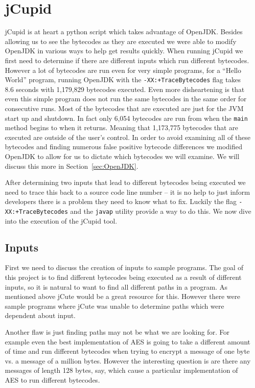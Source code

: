 \documentclass[letterpaper,twocolumn,10pt]{article}
\begin{document}
\section{jCupid}
jCupid is at heart a python script which takes advantage of OpenJDK. Besides allowing us to see the bytecodes as they are executed we were able to modify OpenJDK in various ways to help get results quickly. When running jCupid we first need to determine if there are different inputs which run different bytecodes. However a lot of bytecodes are run even for very simple programs, for a ``Hello World'' program, running OpenJDK with the \texttt{-XX:+TraceBytecodes} flag takes 8.6 seconds with 1,179,829 bytecodes executed. Even more disheartening is that even this simple program does not run the same bytecodes in the same order for consecutive runs. Most of the bytecodes that are executed are just for the JVM start up and shutdown. In fact only 6,054 bytecodes are run from when the \texttt{main} method begins to when it returns. Meaning that 1,173,775 bytecodes that are executed are outside of the user's control. In order to avoid examining all of these bytecodes and finding numerous false positive bytecode differences we modified OpenJDK to allow for us to dictate which bytecodes we will examine. We will discuss this more in Section~\ref{sec:OpenJDK}.

After determining two inputs that lead to different bytecodes being executed we need to trace this back to a source code line number -- it is no help to just inform developers there is a problem they need to know what to fix. Luckily the flag \texttt{-XX:+TraceBytecodes} and the \texttt{javap} utility provide a way to do this. We now dive into the execution of the jCupid tool.

\subsection{Inputs}

First we need to discuss the creation of inputs to sample programs. The goal of this project is to find different bytecodes being executed as a result of different inputs, so it is natural to want to find all different paths in a program. As mentioned above jCute would be a great resource for this. However there were sample programs where jCute was unable to determine paths which were dependent about input. 

Another flaw is just finding paths may not be what we are looking for. For example even the best implementation of AES is going to take a different amount of time and run different bytecodes when trying to encrypt a message of one byte vs. a message of a million bytes. However the interesting question is are there any messages of length 128 bytes, say, which cause a particular implementation of AES to run different bytecodes. 
\end{document}
